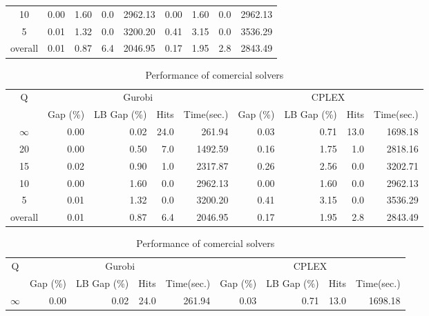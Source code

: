 \begin{table}[H]
\begin{tabular}{c rrrr rrrr}
      10 &     0.00 &        1.60 &  0.0 &    2962.13 &     0.00 &        1.60 &  0.0 &    2962.13 \\
       5 &     0.01 &        1.32 &  0.0 &    3200.20 &     0.41 &        3.15 &  0.0 &    3536.29 \\
\midrule
 overall &     0.01 &        0.87 &  6.4 &    2046.95 &     0.17 &        1.95 &  2.8 &    2843.49 \\
\bottomrule
\end{tabular}
\end{table}\begin{table}[H]
\centering
\caption{Performance of comercial solvers}
\label{tab:solvers_results}
\begin{tabular}{c rrrr rrrr}
\toprule
       Q & \multicolumn{4}{c}{Gurobi} & \multicolumn{4}{c}{CPLEX} \\
         & Gap (\%) & LB Gap (\%) & Hits & Time(sec.) & Gap (\%) & LB Gap (\%) & Hits & Time(sec.) \\
\midrule
$\infty$ &     0.00 &        0.02 & 24.0 &     261.94 &     0.03 &        0.71 & 13.0 &    1698.18 \\
      20 &     0.00 &        0.50 &  7.0 &    1492.59 &     0.16 &        1.75 &  1.0 &    2818.16 \\
      15 &     0.02 &        0.90 &  1.0 &    2317.87 &     0.26 &        2.56 &  0.0 &    3202.71 \\
      10 &     0.00 &        1.60 &  0.0 &    2962.13 &     0.00 &        1.60 &  0.0 &    2962.13 \\
       5 &     0.01 &        1.32 &  0.0 &    3200.20 &     0.41 &        3.15 &  0.0 &    3536.29 \\
\midrule
 overall &     0.01 &        0.87 &  6.4 &    2046.95 &     0.17 &        1.95 &  2.8 &    2843.49 \\
\bottomrule
\end{tabular}
\end{table}\begin{table}[H]
\centering
\caption{Performance of comercial solvers}
\label{tab:solvers_results}
\begin{tabular}{c rrrr rrrr}
\toprule
       Q & \multicolumn{4}{c}{Gurobi} & \multicolumn{4}{c}{CPLEX} \\
         & Gap (\%) & LB Gap (\%) & Hits & Time(sec.) & Gap (\%) & LB Gap (\%) & Hits & Time(sec.) \\
\midrule
$\infty$ &     0.00 &        0.02 & 24.0 &     261.94 &     0.03 &        0.71 & 13.0 &    1698.18 \\

\end{tabular}
\end{table}

